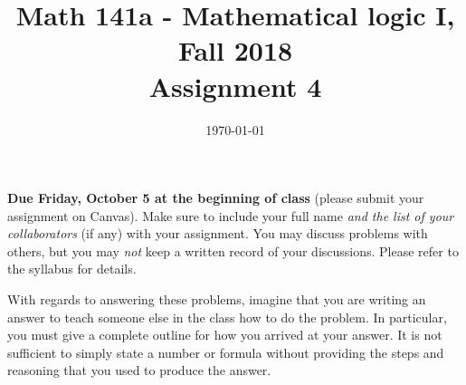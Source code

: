 \documentclass{amsart}
\title[Math 141a, Fall 2018: assignment 4]{Math 141a - Mathematical logic I, Fall 2018 \\ Assignment 4}
\date{\today}
\theoremstyle{definition}
\begin{document}

\maketitle

\textbf{Due Friday, October 5 at the beginning of class} (please submit your assignment on Canvas). Make sure to include your full name \emph{and the list of your collaborators} (if any) with your assignment. You may discuss problems with others, but you may \emph{not} keep a written record of your discussions. Please refer to the syllabus for details.

With regards to answering these problems, imagine that you are writing an answer to teach someone else in the class how to do the problem. In particular, you must give a complete outline for how you arrived at your answer. It is not sufficient to simply state a number or formula without providing the steps and reasoning that you used to produce the answer.
\end{document}
